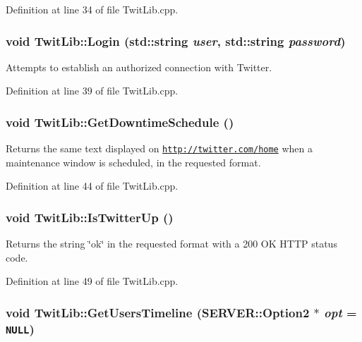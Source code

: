 Definition at line 34 of file TwitLib.cpp.\hypertarget{classTwitLib_f0260115262ab0078071a4af3407b635}{
\subsubsection{\setlength{\rightskip}{0pt plus 5cm}void TwitLib::Login (std::string {\em user}, \/  std::string {\em password})}}
\label{classTwitLib_f0260115262ab0078071a4af3407b635}


Attempts to establish an authorized connection with Twitter. 

Definition at line 39 of file TwitLib.cpp.\hypertarget{classTwitLib_0c5eb8acd3bc570d2230c0a999ba2caf}{
\subsubsection{\setlength{\rightskip}{0pt plus 5cm}void TwitLib::GetDowntimeSchedule ()}}
\label{classTwitLib_0c5eb8acd3bc570d2230c0a999ba2caf}


Returns the same text displayed on \href{http://twitter.com/home}{\tt http://twitter.com/home} when a maintenance window is scheduled, in the requested format. 

Definition at line 44 of file TwitLib.cpp.\hypertarget{classTwitLib_3f90df9ede601963bb0ce8b1bcdb9886}{
\subsubsection{\setlength{\rightskip}{0pt plus 5cm}void TwitLib::IsTwitterUp ()}}
\label{classTwitLib_3f90df9ede601963bb0ce8b1bcdb9886}


Returns the string \char`\"{}ok\char`\"{} in the requested format with a 200 OK HTTP status code. 

Definition at line 49 of file TwitLib.cpp.\hypertarget{classTwitLib_fe45ea97705c30d9f635a3ddf04cb27b}{
\subsubsection{\setlength{\rightskip}{0pt plus 5cm}void TwitLib::GetUsersTimeline ({\bf SERVER::Option2} $\ast$ {\em opt} = {\tt NULL})}}
\label{classTwitLib_fe45ea97705c30d9f635a3ddf04cb27b}


